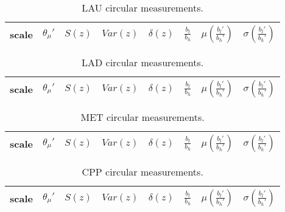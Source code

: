 \begin{table*}[!h]
	\caption{LAU circular measurements.}
\begin{center}
    \begin{tabular}{ |l|| c|c|c|c|c||c|c| }
        \hline
    scale & $\theta_\mu'$ & $S(z)$ & $Var(z)$ & $\delta(z)$ & $\frac{b_l}{b_h}$ & $ \mu(\frac{b_l'}{b_h'}) $ & $ \sigma(\frac{b_l'}{b_h'}) $ \\ \hline
	
    \end{tabular}
\end{center}
\label{tab:circLau}
\end{table*}
\begin{table*}[!h]
	\caption{LAD circular measurements.}
\begin{center}
    \begin{tabular}{ |l|| c|c|c|c|c||c|c| }
        \hline
        scale & $\theta_\mu'$ & $S(z)$ & $Var(z)$ & $\delta(z)$ & $\frac{b_l}{b_h}$ & $ \mu(\frac{b_l'}{b_h'}) $ & $ \sigma(\frac{b_l'}{b_h'}) $ \\ \hline
	
    \end{tabular}
\end{center}
\label{tab:circLad}
\end{table*}
\begin{table*}[!h]
	\caption{MET circular measurements.}
\begin{center}
    \begin{tabular}{ |l|| c|c|c|c|c||c|c| }
        \hline
        scale & $\theta_\mu'$ & $S(z)$ & $Var(z)$ & $\delta(z)$ & $\frac{b_l}{b_h}$ & $ \mu(\frac{b_l'}{b_h'}) $ & $ \sigma(\frac{b_l'}{b_h'}) $ \\ \hline
	
    \end{tabular}
\end{center}
\label{tab:circMet}
\end{table*}
\begin{table*}[!h]
	\caption{CPP circular measurements.}
\begin{center}
    \begin{tabular}{ |l|| c|c|c|c|c||c|c| }
        \hline
        scale & $\theta_\mu'$ & $S(z)$ & $Var(z)$ & $\delta(z)$ & $\frac{b_l}{b_h}$ & $ \mu(\frac{b_l'}{b_h'}) $ & $ \sigma(\frac{b_l'}{b_h'})$ \\ \hline
	
    \end{tabular}
\end{center}
\label{tab:circCPP}
\end{table*}

